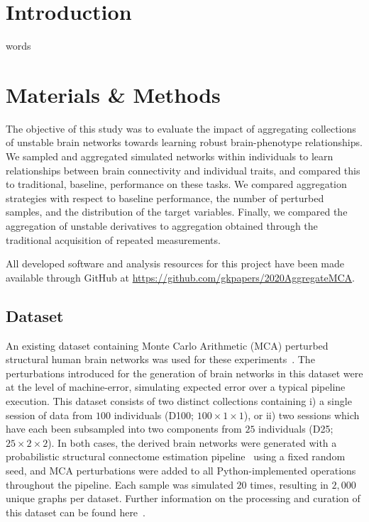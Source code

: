 \documentclass[fleqn,10pt]{SelfArx} %
\affiliation{\textsuperscript{1}\textit{Montréal Neurological Institute, McGill University, Montréal, QC, Canada}}
\affiliation{\textsuperscript{2}\textit{Department of Computer Science and Software Engineering, Concordia University, Montréal, QC, Canada}}
\begin{document}
\flushbottom %
\maketitle %
\thispagestyle{empty} %


\section*{Introduction}
words

\section*{Materials \& Methods}

The objective of this study was to evaluate the impact of aggregating collections of unstable brain networks towards
learning robust brain-phenotype relationships. We sampled and aggregated simulated networks within individuals to learn
relationships between brain connectivity and individual traits, and compared this to traditional, baseline, performance
on these tasks. We compared aggregation strategies with respect to baseline performance, the number of perturbed
samples, and the distribution of the target variables. Finally, we compared the aggregation of unstable derivatives to
aggregation obtained through the traditional acquisition of repeated measurements.

All developed software and analysis resources for this project have been made available through GitHub at
\url{https://github.com/gkpapers/2020AggregateMCA}.

\subsection*{Dataset}

An existing dataset containing Monte Carlo Arithmetic (MCA) perturbed structural human brain networks was used for
these experiments~\cite{Kiar2020-yz}. The perturbations introduced for the generation of brain networks in this dataset
were at the level of machine-error, simulating expected error over a typical pipeline execution. This dataset consists
of two distinct collections containing i) a single session of data from $100$ individuals (D100;
$100\times 1 \times1$), or ii) two sessions which have each been subsampled into two components from $25$ individuals
(D25; $25\times 2\times 2$). In both cases, the derived brain networks were generated with a probabilistic structural
connectome estimation pipeline~\cite{Garyfallidis2014-ql} using a fixed random seed, and MCA perturbations were added
to all Python-implemented operations throughout the pipeline. Each sample was simulated $20$ times, resulting in
$2,000$ unique graphs per dataset. Further information on the processing and curation of this dataset can be found
here~\cite{Garyfallidis2014-ql}.
\end{document}
